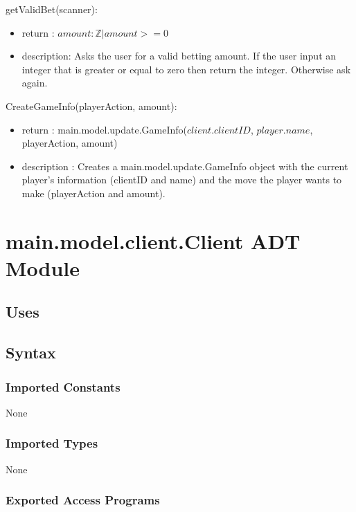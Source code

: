 \documentclass[12pt, titlepage]{article}
\begin{document}
        \noindent getValidBet(scanner):
        \begin{itemize}
        \item return : $amount : \mathbb{Z} | amount >= 0$
        \item description: Asks the user for a valid betting amount. If the user input an integer that is greater or equal to zero then return the integer. Otherwise ask again.
        \end{itemize}
        
        \noindent CreateGameInfo(playerAction, amount):
        \begin{itemize}
        \item return : main.model.update.GameInfo($client.clientID$, $player.name$, playerAction, amount)
        \item description : Creates a main.model.update.GameInfo object with the current player's information (clientID and name) and the move the player wants to make (playerAction and amount).
        \end{itemize}
        
                
        
\section* {main.model.client.Client ADT Module}
    \subsection* {Uses}
    \subsection* {Syntax}
    
        \subsubsection* {Imported Constants}
            None
        \subsubsection* {Imported Types}
            None
        \subsubsection* {Exported Access Programs}
        
\end{document}
